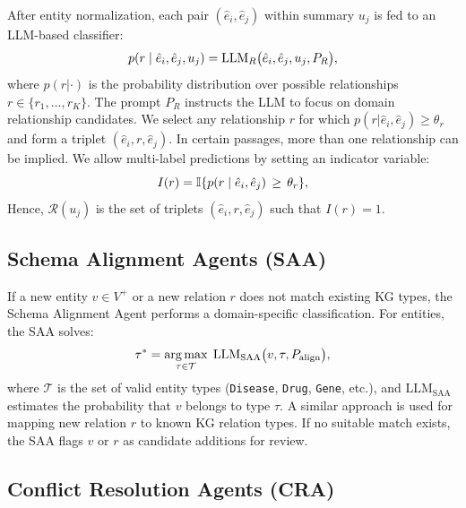 \documentclass{article}
\begin{document}
After entity normalization, each pair $(\hat{e}_i, \hat{e}_j)$ within summary $u_j$ is fed to an LLM-based classifier:
\begin{equation}
\fontsize{9pt}{7pt}\selectfont
p(r \mid \hat{e}_i, \hat{e}_j, u_j)
= \mathrm{LLM}_{R}\bigl( \hat{e}_i, \hat{e}_j, u_j, P_R \bigr),
\label{eq:rel_classification}
\end{equation}
where $p(r|\cdot)$ is the probability distribution over possible relationships $r \in \{r_1,\dots,r_K\}$. The prompt $P_R$ instructs the LLM to focus on domain relationship candidates. We select any relationship $r$ for which $p(r|\hat{e}_i,\hat{e}_j) \ge \theta_r$ and form a triplet $(\hat{e}_i, r, \hat{e}_j)$. In certain passages, more than one relationship can be implied. We allow multi-label predictions by setting an indicator variable:
\begin{equation}
\fontsize{9pt}{7pt}\selectfont
I(r) 
= \mathbb{I}\{p(r \mid \hat{e}_i, \hat{e}_j) \,\ge\, \theta_r\},
\end{equation}
Hence, $\mathcal{R}(u_j)$ is the set of triplets $(\hat{e}_i, r, \hat{e}_j)$ such that $I(r)=1$.

\subsection{Schema Alignment Agents (SAA)}

If a new entity $v \in V^{+}$ or a new relation $r$ does not match existing KG types, the Schema Alignment Agent performs a domain-specific classification. For entities, the SAA solves:
\begin{equation}
\fontsize{9pt}{7pt}\selectfont
\tau^{*}
= \operatorname*{arg\,max}_{\tau \in \mathcal{T}} 
\;\mathrm{LLM}_{\mathrm{SAA}}\bigl(v, \tau, P_{\mathrm{align}}\bigr),
\end{equation}
where $\mathcal{T}$ is the set of valid entity types (\texttt{Disease}, \texttt{Drug}, \texttt{Gene}, etc.), and $\mathrm{LLM}_{\mathrm{SAA}}$ estimates the probability that $v$ belongs to type $\tau$. A similar approach is used for mapping new relation $r$ to known KG relation types. If no suitable match exists, the SAA flags $v$ or $r$ as candidate additions for review.

\subsection{Conflict Resolution Agents (CRA)}
\end{document}
